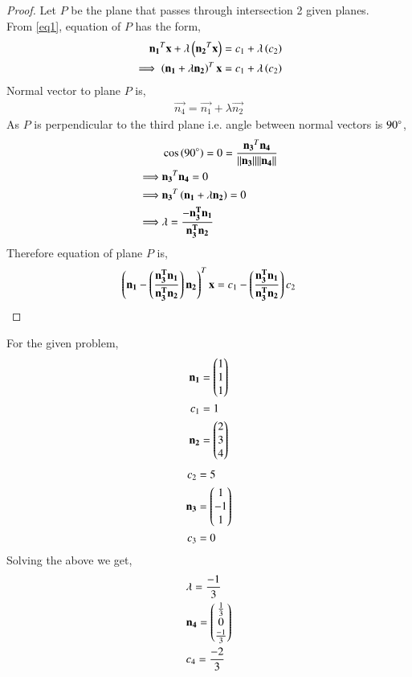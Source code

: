 \documentclass[journal,12pt,twocolumn]{IEEEtran}
\begin{document}
\begin{proof}
   Let $P$ be the plane that passes through intersection 2 given planes.\\  From \eqref{eq1}, equation of $P$ has the form,
   \begin{align}
       \mathbf{n_{1}}^T\mathbf{x} + \lambda\left(\mathbf{n_{2}}^T\mathbf{x}\right) = c_{1} + \lambda\left(c_{2}\right)\\
       \implies \left(\mathbf{n_{1}}+\lambda\mathbf{n_{2}}\right)^T\mathbf{x} = c_{1} + \lambda\left(c_{2}\right)
   \end{align}
  Normal vector to plane $P$ is,
 \begin{align}
     \vec{n_{4}} = \vec{n_{1}}+\lambda\vec{n_{2}}
 \end{align}
 As $P$ is perpendicular to the third plane i.e. angle between normal vectors is $90\degree$, 
 \begin{align}
     &\cos\left(90\degree\right) = 0 = \dfrac{\mathbf{n_{3}}^T\mathbf{n_{4}}}{\lVert\mathbf{n_{3}}\rVert\lVert\mathbf{n_{4}}\rVert}\\
    \implies &\mathbf{n_{3}}^T\mathbf{n_{4}} = 0\\
    \implies &\mathbf{n_{3}}^T\left(\mathbf{n_{1}}+\lambda\mathbf{n_{2}}\right) = 0\\
    \implies &\lambda = \frac{-\mathbf{n_{3}^T\mathbf{n_1}}}{\mathbf{n_{3}^T\mathbf{n_2}}}
 \end{align}
 Therefore equation of plane $P$ is,
 \begin{align}
     \left(\mathbf{n_{1}} - \left(\frac{\mathbf{n_{3}^T\mathbf{n_1}}}{\mathbf{n_{3}^T\mathbf{n_2}}}\right)\mathbf{n_2}\right)^T\mathbf{x} = c_{1} - \left(\frac{\mathbf{n_{3}^T\mathbf{n_1}}}{\mathbf{n_{3}^T\mathbf{n_2}}}\right)c_{2}
 \end{align}
\end{proof}
For the given problem,
\begin{align}
  \mathbf{n_{1}}&=\begin{pmatrix}1\\1\\1\end{pmatrix}\\c_{1}&=1\\
  \mathbf{n_{2}}&=\begin{pmatrix}2\\3\\4\end{pmatrix}
 \end{align}
 \begin{align}
     c_{2}&=5\\
  \mathbf{n_{3}}&=\begin{pmatrix}1\\-1\\1\end{pmatrix}\\c_{3}&=0 
 \end{align}
Solving the above we get,
\begin{align}
    &\lambda = \frac{-1}{3}\\
    &\mathbf{n_{4}} = \begin{pmatrix}\frac{1}{3}\\0\\\frac{-1}{3}\end{pmatrix}\\
    &c_{4} = \frac{-2}{3}
\end{align}
\end{document}
